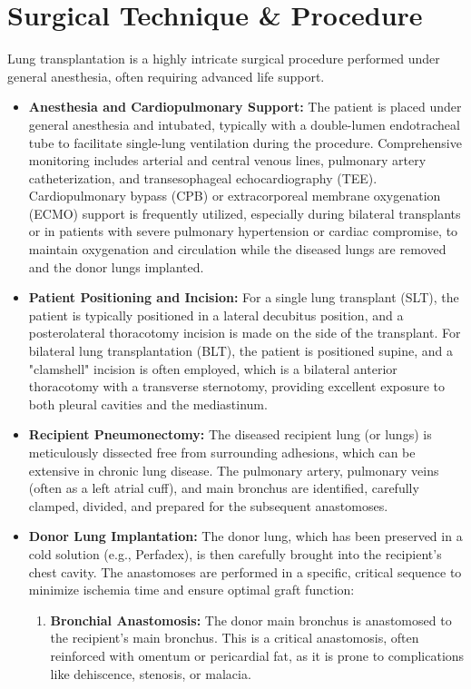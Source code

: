 \section*{Surgical Technique \& Procedure}
Lung transplantation is a highly intricate surgical procedure performed under general anesthesia, often requiring advanced life support.

\begin{itemize}
  \item \textbf{Anesthesia and Cardiopulmonary Support:} The patient is placed under general anesthesia and intubated, typically with a double-lumen endotracheal tube to facilitate single-lung ventilation during the procedure. Comprehensive monitoring includes arterial and central venous lines, pulmonary artery catheterization, and transesophageal echocardiography (TEE). Cardiopulmonary bypass (CPB) or extracorporeal membrane oxygenation (ECMO) support is frequently utilized, especially during bilateral transplants or in patients with severe pulmonary hypertension or cardiac compromise, to maintain oxygenation and circulation while the diseased lungs are removed and the donor lungs implanted.
  \item \textbf{Patient Positioning and Incision:} For a single lung transplant (SLT), the patient is typically positioned in a lateral decubitus position, and a posterolateral thoracotomy incision is made on the side of the transplant. For bilateral lung transplantation (BLT), the patient is positioned supine, and a "clamshell" incision is often employed, which is a bilateral anterior thoracotomy with a transverse sternotomy, providing excellent exposure to both pleural cavities and the mediastinum.
  \item \textbf{Recipient Pneumonectomy:} The diseased recipient lung (or lungs) is meticulously dissected free from surrounding adhesions, which can be extensive in chronic lung disease. The pulmonary artery, pulmonary veins (often as a left atrial cuff), and main bronchus are identified, carefully clamped, divided, and prepared for the subsequent anastomoses.
  \item \textbf{Donor Lung Implantation:} The donor lung, which has been preserved in a cold solution (e.g., Perfadex), is then carefully brought into the recipient's chest cavity. The anastomoses are performed in a specific, critical sequence to minimize ischemia time and ensure optimal graft function:
    \begin{enumerate}
      \item \textbf{Bronchial Anastomosis:} The donor main bronchus is anastomosed to the recipient's main bronchus. This is a critical anastomosis, often reinforced with omentum or pericardial fat, as it is prone to complications like dehiscence, stenosis, or malacia.

\end{enumerate}
\end{itemize}
